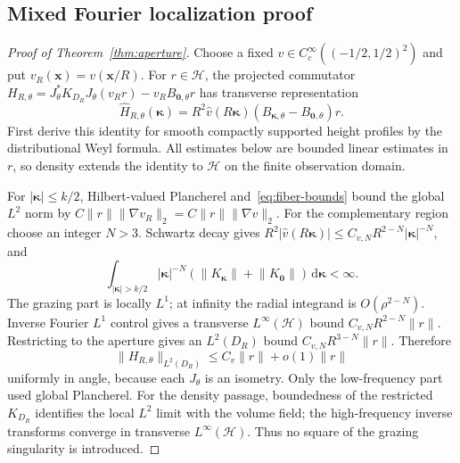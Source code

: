 \documentclass[11pt]{article}
\newcommand{\dd}{\,\mathrm{d}}
\newcommand{\norm}[1]{\lVert #1\rVert}
\newcommand{\abs}[1]{\lvert #1\rvert}
\begin{document}
\subsection{Mixed Fourier localization proof}
\begin{proof}[Proof of Theorem~\ref{thm:aperture}]
Choose a fixed $v\in C_c^\infty((-1/2,1/2)^2)$ and put $v_R(\mathbf x)=v(\mathbf x/R)$. For $r\in\mathcal H$, the projected commutator $H_{R,\theta}=J_\theta^*K_{D_R}J_\theta(v_Rr)-v_RB_{\mathbf0,\theta}r$ has transverse representation
\begin{equation}\label{eq:commutator}
 \widehat H_{R,\theta}(\boldsymbol\kappa)
 =R^2\widehat v(R\boldsymbol\kappa)(B_{\boldsymbol\kappa,\theta}-B_{\mathbf0,\theta})r.
\end{equation}
First derive this identity for smooth compactly supported height profiles by the distributional Weyl formula. All estimates below are bounded linear estimates in $r$, so density extends the identity to $\mathcal H$ on the finite observation domain.

For $\abs{\boldsymbol\kappa}\leq k/2$, Hilbert-valued Plancherel and~\eqref{eq:fiber-bounds} bound the global $L^2$ norm by $C\norm r\norm{\nabla v_R}_2=C\norm r\norm{\nabla v}_2$. For the complementary region choose an integer $N>3$. Schwartz decay gives $R^2\abs{\widehat v(R\boldsymbol\kappa)}\leq C_{v,N}R^{2-N}\abs{\boldsymbol\kappa}^{-N}$, and
\begin{equation}\label{eq:grazing-integral}
 \int_{\abs{\boldsymbol\kappa}>k/2}\abs{\boldsymbol\kappa}^{-N}
 (\norm{K_{\boldsymbol\kappa}}+\norm{K_{\mathbf0}})\dd\boldsymbol\kappa<\infty.
\end{equation}
The grazing part is locally $L^1$; at infinity the radial integrand is $O(\rho^{2-N})$. Inverse Fourier $L^1$ control gives a transverse $L^\infty(\mathcal H)$ bound $C_{v,N}R^{2-N}\norm r$. Restricting to the aperture gives an $L^2(D_R)$ bound $C_{v,N}R^{3-N}\norm r$. Therefore
\begin{equation}\label{eq:commutator-bound}
 \norm{H_{R,\theta}}_{L^2(D_R)}\leq C_v\norm r+o(1)\norm r
\end{equation}
uniformly in angle, because each $J_\theta$ is an isometry. Only the low-frequency part used global Plancherel. For the density passage, boundedness of the restricted $K_{D_R}$ identifies the local $L^2$ limit with the volume field; the high-frequency inverse transforms converge in transverse $L^\infty(\mathcal H)$. Thus no square of the grazing singularity is introduced.


\end{proof}
\end{document}
